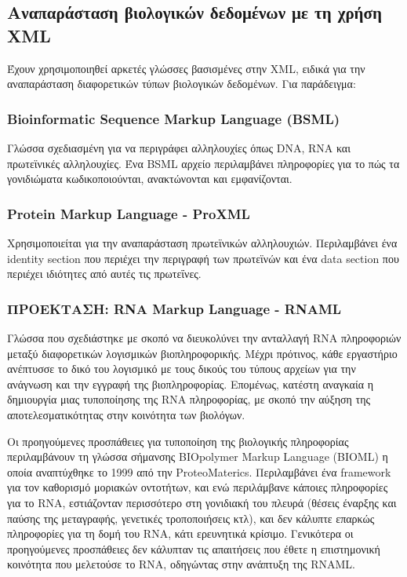     \subsection{Αναπαράσταση βιολογικών δεδομένων με τη χρήση XML}
        Έχουν χρησιμοποιηθεί αρκετές γλώσσες βασισμένες στην XML, ειδικά για την αναπαράσταση διαφορετικών τύπων βιολογικών δεδομένων. Για παράδειγμα:

        \subsubsection{Bioinformatic Sequence Markup Language (BSML)}
            Γλώσσα σχεδιασμένη για να περιγράφει αλληλουχίες όπως DNA, RNA και πρωτεϊνικές αλληλουχίες.
            Ένα BSML αρχείο περιλαμβάνει πληροφορίες για το πώς τα γονιδιώματα κωδικοποιούνται, ανακτώνονται και εμφανίζονται.

        \subsubsection{Protein Markup Language - ProXML}
            Χρησιμοποιείται για την αναπαράσταση πρωτεϊνικών αλληλουχιών.
            Περιλαμβάνει ένα identity section που περιέχει την περιγραφή των πρωτεϊνών και ένα data section που περιέχει ιδιότητες από αυτές τις πρωτεΐνες.

        \subsubsection{ΠΡΟΕΚΤΑΣΗ: RNA Markup Language - RNAML}
            Γλώσσα που σχεδιάστηκε με σκοπό να διευκολύνει την ανταλλαγή RNA πληροφοριών μεταξύ διαφορετικών λογισμικών βιοπληροφορικής. \cite{RNAML}
            Μέχρι πρότινος, κάθε εργαστήριο ανέπτυσσε το δικό του λογισμικό με τους δικούς του τύπους αρχείων για την ανάγνωση και την εγγραφή της βιοπληροφορίας.
            Επομένως, κατέστη αναγκαία η δημιουργία μιας τυποποίησης της RNA πληροφορίας, με σκοπό την αύξηση της αποτελεσματικότητας στην κοινότητα των βιολόγων.

            Οι προηγούμενες προσπάθειες για τυποποίηση της βιολογικής πληροφορίας περιλαμβάνουν τη γλώσσα σήμανσης BIOpolymer Markup Language (BIOML)  η οποία αναπτύχθηκε το 1999 από την ProteoMaterics.
            Περιλαμβάνει ένα framework για τον καθορισμό μοριακών οντοτήτων, και ενώ περιλάμβανε κάποιες πληροφορίες για το RNA, εστιάζονταν περισσότερο στη γονιδιακή του πλευρά
                (θέσεις έναρξης και παύσης της μεταγραφής, γενετικές τροποποιήσεις κτλ), και δεν κάλυπτε επαρκώς πληροφορίες για τη δομή του RNA, κάτι ερευνητικά κρίσιμο.
            Γενικότερα οι προηγούμενες προσπάθειες δεν κάλυπταν τις απαιτήσεις που έθετε η επιστημονική κοινότητα που μελετούσε το RNA, οδηγώντας στην ανάπτυξη της RNAML.

